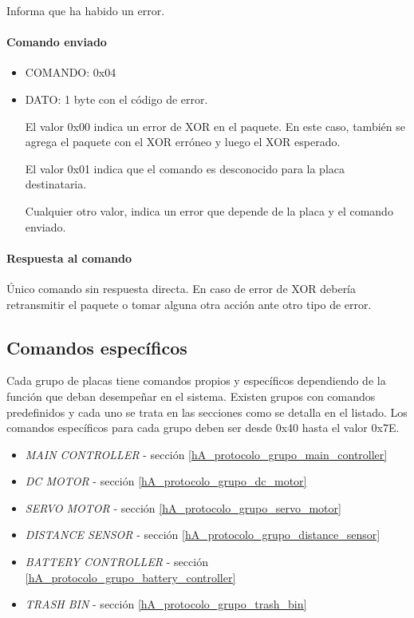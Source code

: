 Informa que ha habido un error.

\paragraph*{Comando enviado}
\label{hA_protocolo_error_comando_enviado}

\begin{itemize}
	\item{COMANDO:} 0x04
	\item{DATO:} 1 byte con el c\'odigo de error.

	El valor 0x00 indica un error de XOR en el paquete. 
	En este caso, tambi\'en se agrega el paquete con el XOR err\'oneo y luego el XOR esperado.

	El valor 0x01 indica que el comando es desconocido para la placa destinataria.

	Cualquier otro valor, indica un error que depende de la placa y el comando enviado.
\end{itemize}

\paragraph*{Respuesta al comando}
\label{hA_protocolo_error_respuesta}

\'Unico comando sin respuesta directa.
En caso de error de XOR deber\'ia retransmitir el paquete o tomar alguna otra acci\'on ante otro tipo de error.

\subsection{Comandos espec\'ificos}
\label{hA_protocolo_comandos_especificos}

Cada grupo de placas tiene comandos propios y espec\'ificos dependiendo de la funci\'on que deban desempe\~nar en el sistema.
Existen grupos con comandos predefinidos y cada uno se trata en las secciones como se detalla en el listado.
Los comandos espec\'ificos para cada grupo deben ser desde 0x40 hasta el valor 0x7E.

\begin{itemize}
	\item \emph{MAIN CONTROLLER} - secci\'on \ref{hA_protocolo_grupo_main_controller}
	\item \emph{DC MOTOR} - secci\'on \ref{hA_protocolo_grupo_dc_motor}
	\item \emph{SERVO MOTOR} - secci\'on \ref{hA_protocolo_grupo_servo_motor}
	\item \emph{DISTANCE SENSOR} - secci\'on \ref{hA_protocolo_grupo_distance_sensor}
	\item \emph{BATTERY CONTROLLER} - secci\'on \ref{hA_protocolo_grupo_battery_controller}
	\item \emph{TRASH BIN} - secci\'on \ref{hA_protocolo_grupo_trash_bin}
\label{hA_protocolo_grupos_listado}
\end{itemize}

